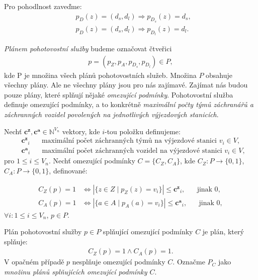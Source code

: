 Pro pohodlnost zaveďme:
\begin{align*}
  & p_D(z) = (d_s, d_l) \Rightarrow p_{D_s}(z) = d_s, \\
  & p_D(z) = (d_s, d_l) \Rightarrow p_{D_l}(z) = d_l.
\end{align*}

\textit{Plánem pohotovostní služby} budeme označovat 
čtveřici
\begin{align*}
  p = (p_Z, p_A, p_{D_{s}}, p_{D_{l}}) \in P,
\end{align*}
kde P je množina všech plánů pohotovostních služeb.
Množina $P$ obsahuje všechny plány. Ale ne všechny plány jsou pro nás zajímavé.
Zajímat nás budou pouze plány, které splňují nějaké \textit{omezující podmínky}.
Pohotovostní služba definuje omezující podmínky, a to konkrétně \textit{maximální počty týmů záchranářů a záchranných vozidel povolených na jednotlivých výjezdových stanicích}.

\clearpage

\begin{definice}
  Nechť $\mathbf{c^z}, \mathbf{c^a} \in \mathbb{N}^{V_n}$ vektory, 
  kde $i$-tou položku definujeme:
  \begin{align*}
    &\mathbf{c^z}_i \hspace{20pt} \text{maximální počet záchranných týmů na výjezdové stanici $v_i \in V$}, \\ 
    &\mathbf{c^a}_i \hspace{20pt} \text{maximální počet záchranných vozidel na výjezdové stanici $v_i \in V$},
  \end{align*}
  pro $1 \leq i \leq V_n$.
  Nechť omezující podmínky $C = \{ C_Z, C_A \}$, kde $C_Z \colon P \rightarrow \{ 0, 1 \}$, $C_A \colon P \rightarrow \{ 0, 1 \}$, definované:

  \begin{align*}
    C_Z(p) = 1 &\iff |\{ z \in Z \mid p_Z(z) = v_i \}| \leq \mathbf{c^z}_i, \hspace{20pt} \text{jinak 0}, \\
    C_A(p) = 1 &\iff |\{ a \in A \mid p_A(a) = v_i \}| \leq \mathbf{c^a}_i, \hspace{20pt} \text{jinak 0},
  \end{align*}
  $\forall i \colon 1 \leq i \leq V_n$, $p \in P$.
\end{definice}

Plán pohotovostní služby $p \in P$ splňující omezující podmínky $C$ je plán, který splňuje:
\begin{align*}
    C_Z(p) = 1 \land C_A(p) = 1.
\end{align*}
V opačném případě $p$ nesplňuje omezující podmínky $C$.
Označme $P_C$ jako \textit{množinu plánů splňujících omezující podmínky $C$}.

